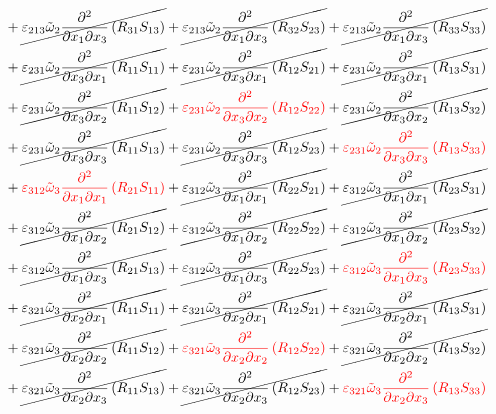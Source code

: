 \begin{equation}
\begin{split}
&		+\cancel{\varepsilon_{213}\tilde{\omega}_{2}\pdv{}{x_{1}}{x_{3}}\left(R_{31}S_{13}\right)}
		+\cancel{\varepsilon_{213}\tilde{\omega}_{2}\pdv{}{x_{1}}{x_{3}}\left(R_{32}S_{23}\right)}
		+\cancel{\varepsilon_{213}\tilde{\omega}_{2}\pdv{}{x_{1}}{x_{3}}\left(R_{33}S_{33}\right)}\\
&		+\cancel{\varepsilon_{231}\tilde{\omega}_{2}\pdv{}{x_{3}}{x_{1}}\left(R_{11}S_{11}\right)}
		+\cancel{\varepsilon_{231}\tilde{\omega}_{2}\pdv{}{x_{3}}{x_{1}}\left(R_{12}S_{21}\right)}
		+\cancel{\varepsilon_{231}\tilde{\omega}_{2}\pdv{}{x_{3}}{x_{1}}\left(R_{13}S_{31}\right)}\\
&		+\cancel{\varepsilon_{231}\tilde{\omega}_{2}\pdv{}{x_{3}}{x_{2}}\left(R_{11}S_{12}\right)}
		+{\color{red}\varepsilon_{231}\tilde{\omega}_{2}\pdv{}{x_{3}}{x_{2}}\left(R_{12}S_{22}\right)}
		+\cancel{\varepsilon_{231}\tilde{\omega}_{2}\pdv{}{x_{3}}{x_{2}}\left(R_{13}S_{32}\right)}\\
&		+\cancel{\varepsilon_{231}\tilde{\omega}_{2}\pdv{}{x_{3}}{x_{3}}\left(R_{11}S_{13}\right)}
		+\cancel{\varepsilon_{231}\tilde{\omega}_{2}\pdv{}{x_{3}}{x_{3}}\left(R_{12}S_{23}\right)}
		+{\color{red}\varepsilon_{231}\tilde{\omega}_{2}\pdv{}{x_{3}}{x_{3}}\left(R_{13}S_{33}\right)}\\
&		+{\color{red}\varepsilon_{312}\tilde{\omega}_{3}\pdv{}{x_{1}}{x_{1}}\left(R_{21}S_{11}\right)}
		+\cancel{\varepsilon_{312}\tilde{\omega}_{3}\pdv{}{x_{1}}{x_{1}}\left(R_{22}S_{21}\right)}
		+\cancel{\varepsilon_{312}\tilde{\omega}_{3}\pdv{}{x_{1}}{x_{1}}\left(R_{23}S_{31}\right)}\\
&		+\cancel{\varepsilon_{312}\tilde{\omega}_{3}\pdv{}{x_{1}}{x_{2}}\left(R_{21}S_{12}\right)}
		+\cancel{\varepsilon_{312}\tilde{\omega}_{3}\pdv{}{x_{1}}{x_{2}}\left(R_{22}S_{22}\right)}
		+\cancel{\varepsilon_{312}\tilde{\omega}_{3}\pdv{}{x_{1}}{x_{2}}\left(R_{23}S_{32}\right)}\\
&		+\cancel{\varepsilon_{312}\tilde{\omega}_{3}\pdv{}{x_{1}}{x_{3}}\left(R_{21}S_{13}\right)}
		+\cancel{\varepsilon_{312}\tilde{\omega}_{3}\pdv{}{x_{1}}{x_{3}}\left(R_{22}S_{23}\right)}
		+{\color{red}\varepsilon_{312}\tilde{\omega}_{3}\pdv{}{x_{1}}{x_{3}}\left(R_{23}S_{33}\right)}\\
&		+\cancel{\varepsilon_{321}\tilde{\omega}_{3}\pdv{}{x_{2}}{x_{1}}\left(R_{11}S_{11}\right)}
		+\cancel{\varepsilon_{321}\tilde{\omega}_{3}\pdv{}{x_{2}}{x_{1}}\left(R_{12}S_{21}\right)}
		+\cancel{\varepsilon_{321}\tilde{\omega}_{3}\pdv{}{x_{2}}{x_{1}}\left(R_{13}S_{31}\right)}\\
&		+\cancel{\varepsilon_{321}\tilde{\omega}_{3}\pdv{}{x_{2}}{x_{2}}\left(R_{11}S_{12}\right)}
		+{\color{red}\varepsilon_{321}\tilde{\omega}_{3}\pdv{}{x_{2}}{x_{2}}\left(R_{12}S_{22}\right)}
		+\cancel{\varepsilon_{321}\tilde{\omega}_{3}\pdv{}{x_{2}}{x_{2}}\left(R_{13}S_{32}\right)}\\
&		+\cancel{\varepsilon_{321}\tilde{\omega}_{3}\pdv{}{x_{2}}{x_{3}}\left(R_{11}S_{13}\right)}
		+\cancel{\varepsilon_{321}\tilde{\omega}_{3}\pdv{}{x_{2}}{x_{3}}\left(R_{12}S_{23}\right)}
		+{\color{red}\varepsilon_{321}\tilde{\omega}_{3}\pdv{}{x_{2}}{x_{3}}\left(R_{13}S_{33}\right)}\\
	\end{split}
\end{equation}

